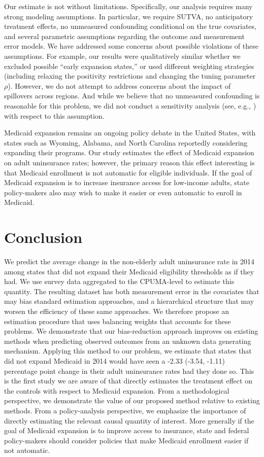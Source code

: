 \documentclass[aoas]{imsart}
\theoremstyle{plain}
\theoremstyle{remark}
\begin{document}
Our estimate is not without limitations. Specifically, our analysis requires many strong modeling assumptions. In particular, we require SUTVA, no anticipatory treatment effects, no unmeasured confounding conditional on the true covariates, and several parametric assumptions regarding the outcome and measurement error models. We have addressed some concerns about possible violations of these assumptions. For example, our results were qualitatively similar whether we excluded possible ``early expansion states,'' or used different weighting strategies (including relaxing the positivity restrictions and changing the tuning parameter $\rho$). However, we do not attempt to address concerns about the impact of spillovers across regions. And while we believe that no unmeasured confounding is reasonable for this problem, we did not conduct a sensitivity analysis (see, e.g., \cite{bonvini2021sensitivity}) with respect to this assumption. 

Medicaid expansion remains an ongoing policy debate in the United States, with states such as Wyoming, Alabama, and North Carolina reportedly considering expanding their programs. Our study estimates the effect of Medicaid expansion on adult uninsurance rates; however, the primary reason this effect interesting is that Medicaid enrollment is not automatic for eligible individuals. If the goal of Medicaid expansion is to increase insurance access for low-income adults, state policy-makers also may wish to make it easier or even automatic to enroll in Medicaid. 

\section{Conclusion}

We predict the average change in the non-elderly adult uninsurance rate in 2014 among states that did not expand their Medicaid eligibility thresholds as if they had. We use survey data aggregated to the CPUMA-level to estimate this quantity. The resulting dataset has both measurement error in the covariates that may bias standard estimation approaches, and a hierarchical structure that may worsen the efficiency of these same approaches. We therefore propose an estimation procedure that uses balancing weights that accounts for these problems. We demonstrate that our bias-reduction approach improves on existing methods when predicting observed outcomes from an unknown data generating mechanism. Applying this method to our problem, we estimate that states that did not expand Medicaid in 2014 would have seen a -2.33 (-3.54, -1.11) percentage point change in their adult uninsurance rates had they done so. This is the first study we are aware of that directly estimates the treatment effect on the controls with respect to Medicaid expansion. From a methodological perspective, we demonstrate the value of our proposed method relative to existing methods. From a policy-analysis perspective, we emphasize the importance of directly estimating the relevant causal quantity of interest. More generally if the goal of Medicaid expansion is to improve access to insurance, state and federal policy-makers should consider policies that make Medicaid enrollment easier if not automatic.
\end{document}
